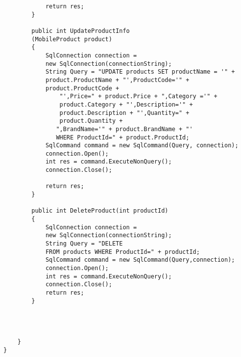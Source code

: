 \begin{lstlisting}
            return res;
        }

        public int UpdateProductInfo
        (MobileProduct product)
        {
            SqlConnection connection = 
            new SqlConnection(connectionString);
            String Query = "UPDATE products SET productName = '" +
            product.ProductName + "',ProductCode='" + 
            product.ProductCode +
                "',Price=" + product.Price + ",Category ='" + 
                product.Category + "',Description='" + 
                product.Description + "',Quantity=" + 
                product.Quantity +
               ",BrandName='" + product.BrandName + "'
               WHERE ProductId=" + product.ProductId;
            SqlCommand command = new SqlCommand(Query, connection);
            connection.Open();
            int res = command.ExecuteNonQuery();
            connection.Close();

            return res;
        }

        public int DeleteProduct(int productId)
        {
            SqlConnection connection = 
            new SqlConnection(connectionString);
            String Query = "DELETE 
            FROM products WHERE ProductId=" + productId;
            SqlCommand command = new SqlCommand(Query,connection);
            connection.Open();
            int res = command.ExecuteNonQuery();
            connection.Close();
            return res;
        }

       

       
    }
}
\end{lstlisting}


\newpage



